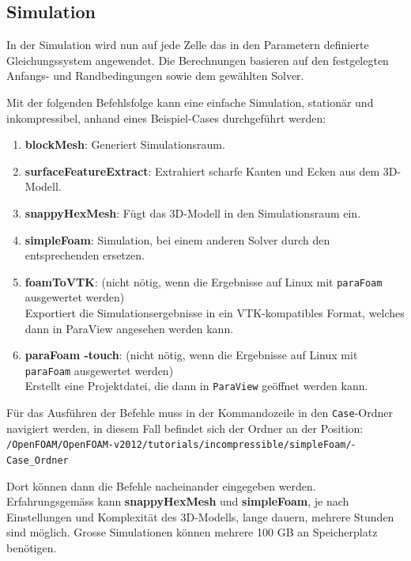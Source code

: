 

\subsection{Simulation \label{openfoam:section:Simulation}}
In der Simulation wird nun auf jede Zelle das in den Parametern definierte Gleichungssystem angewendet.
Die Berechnungen basieren auf den festgelegten Anfangs- und Randbedingungen sowie dem gewählten Solver.

Mit der folgenden Befehlsfolge kann eine einfache Simulation, stationär und inkompressibel, anhand eines Beispiel-Cases durchgeführt werden:

\begin{enumerate}
    \item \textbf{blockMesh}: Generiert Simulationsraum.
    \item \textbf{surfaceFeatureExtract}: Extrahiert scharfe Kanten und Ecken aus dem 3D-Modell.
    \item \textbf{snappyHexMesh}: Fügt das 3D-Modell in den Simulationsraum ein.
    \item \textbf{simpleFoam}: Simulation, bei einem anderen Solver durch den entsprechenden ersetzen.
    \item \textbf{foamToVTK}: (nicht nötig, wenn die Ergebnisse auf Linux mit \texttt{paraFoam} ausgewertet werden)\\
    Exportiert die Simulationsergebnisse in ein VTK-kompatibles Format, welches dann in ParaView angesehen werden kann.
    \item \textbf{paraFoam -touch}: (nicht nötig, wenn die Ergebnisse auf Linux mit \texttt{paraFoam} ausgewertet werden)\\
    Erstellt eine Projektdatei, die dann in \texttt{ParaView} geöffnet werden kann.
\end{enumerate}

Für das Ausführen der Befehle muss in der Kommandozeile in den \texttt{Case}-Ordner navigiert werden, in diesem Fall befindet sich der Ordner an der Position:\\
\texttt{/OpenFOAM/OpenFOAM-v2012/tutorials/incompressible/simpleFoam/}-\\
\texttt{Case\_Ordner}

Dort können dann die Befehle nacheinander eingegeben werden.
Erfahrungsgemäss kann \textbf{snappyHexMesh} und \textbf{simpleFoam}, je nach Einstellungen und Komplexität des 3D-Modells, 
lange dauern, mehrere Stunden sind möglich.
Grosse Simulationen können mehrere 100 GB an Speicherplatz benötigen.

